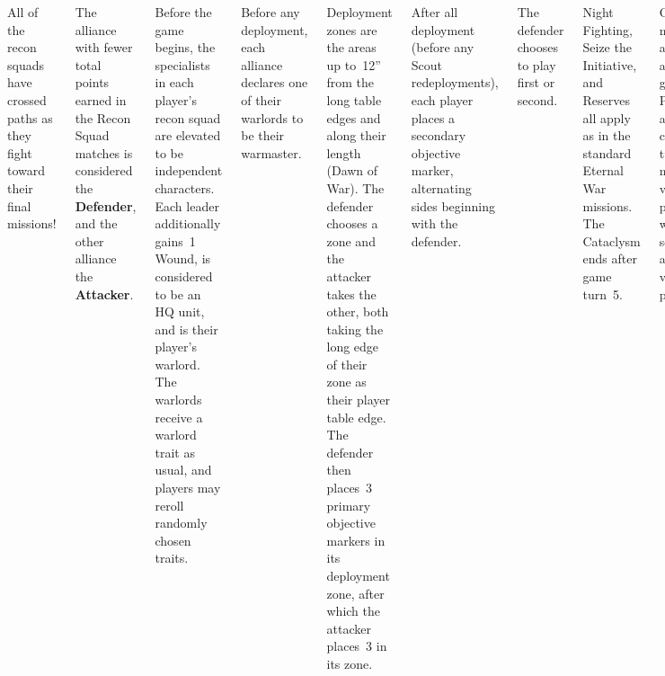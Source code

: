 
\begin{columns}
  
  All of the recon squads have crossed paths as they fight toward
  their final missions!

  The alliance with fewer total points earned in the Recon Squad
  matches is considered the {\bf Defender}, and the other alliance the
  {\bf Attacker}.


  Before the game begins, the specialists in each player's recon squad
  are elevated to be independent characters.  Each leader additionally
  gains~1 Wound, is considered to be an HQ unit, and is their player's
  warlord.  The warlords receive a warlord trait as usual, and players
  may reroll randomly chosen traits.

  Before any deployment, each alliance declares one of their warlords
  to be their warmaster.


  Deployment zones are the areas up to~12'' from the long table edges
  and along their length (Dawn of War).  The defender chooses a zone
  and the attacker takes the other, both taking the long edge of their
  zone as their player table edge.  The defender then places~3 primary
  objective markers in its deployment zone, after which the attacker
  places~3 in its zone.

  After all deployment (before any Scout redeployments), each player
  places a secondary objective marker, alternating sides beginning
  with the defender.

  The defender chooses to play first or second.


  Night Fighting, Seize the Initiative, and Reserves all apply as in
  the standard Eternal War missions.  The Cataclysm ends after game
  turn~5.


  Objective markers are scored after each game turn: Primaries award
  the current turn number in victory points, while secondaries award~1
  victory point.



\end{columns}
